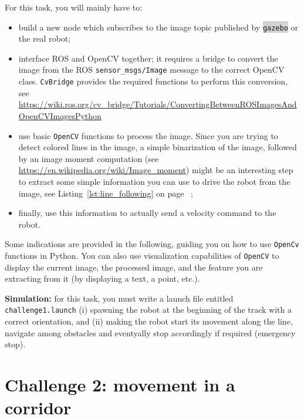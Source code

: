 \documentclass[10pt,a4paper,printanswers]{upmc}
\newcommand{\myline}{\noindent\makebox[\linewidth]{\rule{\textwidth}{0.7pt}}}
\newcommand{\mytext}[1]{\colorbox{lightgray}{\texttt{#1}}}
\begin{document}
\noindent For this task, you will mainly have to:
\begin{itemize}
  \itemsep=-1pt
  \item build a new node which subscribes to the image topic published by \mytext{gazebo} or the
        real robot;
  \item interface ROS and OpenCV together; it requires a bridge to convert the image from the ROS
        \texttt{sensor\_msgs/Image} message to the correct OpenCV class. \texttt{CvBridge} provides
        the required functions to perform this conversion, see
          {\small{\url{https://wiki.ros.org/cv_bridge/Tutorials/ConvertingBetweenROSImagesAndOpenCVImagesPython}}}
  \item use basic \texttt{OpenCV} functions to process the image. Since you are trying to detect
        colored lines in the image, a simple binarization of the image, followed by an image moment
        computation (see \url{https://en.wikipedia.org/wiki/Image_moment}) might be an interesting
        step to extract some simple information you can use to drive the robot from the image, see
        Listing~\ref{lst:line_following} on page~\pageref{lst:line_following} ;
  \item finally, use this information to actually send a velocity command to the robot.
\end{itemize}

Some indications are provided in the following, guiding you on how to use \texttt{OpenCv} functions
in Python. You can also use visualization capabilities of \texttt{OpenCV} to display the current
image, the processed image, and the feature you are extracting from it (by displaying a text, a
point, etc.).

\newpage

\begin{mdframed}[style=evaluation]
  \textbf{Simulation:} for this task, you must write a launch file entitled
  \texttt{challenge1.launch} (i) spawning the robot at the beginning of the track with a correct
  orientation, and (ii) making the robot start its movement along the line, navigate among obstacles
  and eventyally stop accordingly if required (emergency stop).
\end{mdframed}

\section{Challenge 2: movement in a corridor}
\vspace{-0.5cm}\myline\\
\end{document}
